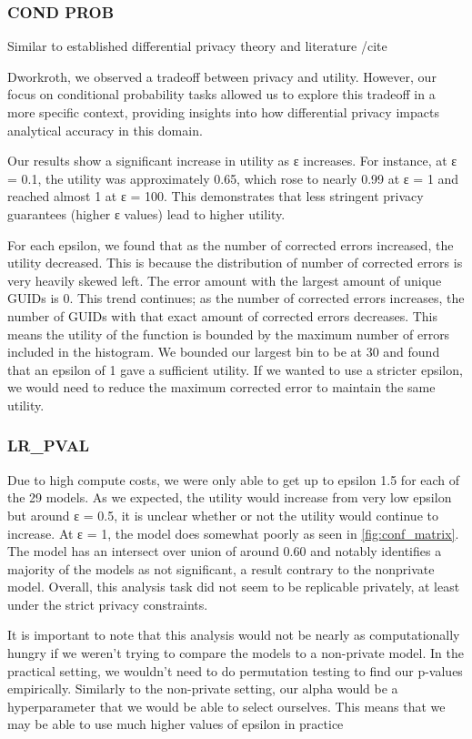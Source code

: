 \documentclass[12pt,letterpaper]{article}
\begin{document}
\subsubsection{COND PROB}
Similar to established differential privacy theory and literature /cite{Dworkroth, we observed a tradeoff between privacy and utility. However, our focus on conditional probability tasks allowed us to explore this tradeoff in a more specific context, providing insights into how differential privacy impacts analytical accuracy in this domain.

Our results show a significant increase in utility as ε increases. For instance, at ε = 0.1, the utility was approximately 0.65, which rose to nearly 0.99 at ε = 1 and reached almost 1 at ε = 100. This demonstrates that less stringent privacy guarantees (higher ε values) lead to higher utility.

For each epsilon, we found that as the number of corrected errors increased, the utility decreased. This is because the distribution of number of corrected errors is very heavily skewed left. The error amount with the largest amount of unique GUIDs is 0. This trend continues; as the number of corrected errors increases, the number of GUIDs with that exact amount of corrected errors decreases. This means the utility of the function is bounded by the maximum number of errors included in the histogram. We bounded our largest bin to be at 30 and found that an epsilon of 1 gave a sufficient utility. If we wanted to use a stricter epsilon, we would need to reduce the maximum corrected error to maintain the same utility. 


\subsubsection{LR\_PVAL}
Due to high compute costs, we were only able to get up to epsilon 1.5 for each of the 29 models. As we expected, the utility would increase from very low epsilon but around ε = 0.5, it is unclear whether or not the utility would continue to increase. At ε = 1, the model does somewhat poorly as seen in \ref{fig:conf_matrix}. The model has an intersect over union of around 0.60 and notably identifies a majority of the models as not significant, a result contrary to the nonprivate model. Overall, this analysis task did not seem to be replicable privately, at least under the strict privacy constraints.

It is important to note that this analysis would not be nearly as computationally hungry if we weren't trying to compare the models to a non-private model. In the practical setting, we wouldn't need to do permutation testing to find our p-values empirically. Similarly to the non-private setting, our alpha would be a hyperparameter that we would be able to select ourselves. This means that we may be able to use much higher values of epsilon in practice

}
\end{document}
